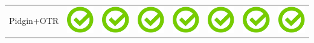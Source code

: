 \documentclass[10pt,foldmark,tumble]{leaflet}
\begin{document}
{\begin{tabular}{ L{2cm} | C{2cm} | C{2cm} | C{2cm} | C{2cm} | C{2cm} | C{2cm} | C{2cm} | }
Pidgin+OTR & \includegraphics[scale=0.1]{pics/haken.png} & \includegraphics[scale=0.1]{pics/haken.png} & \includegraphics[scale=0.1]{pics/haken.png} & \includegraphics[scale=0.1]{pics/haken.png} & \includegraphics[scale=0.1]{pics/haken.png} & \includegraphics[scale=0.1]{pics/haken.png} & \includegraphics[scale=0.1]{pics/haken.png} \tabularnewline

\end{tabular}}
\end{document}
